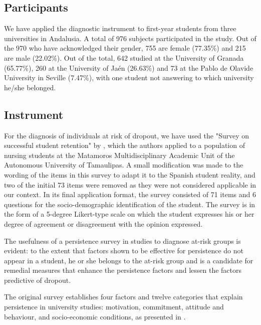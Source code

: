 \documentclass[english]{textolivre}
\begin{document}
\subsection{Participants}\label{sec-modelo}
We have applied the diagnostic instrument to first-year students from three universities in Andalusia. A total of 976 subjects participated in the study. Out of the 970 who have acknowledged their gender, 755 are female (77.35\%) and 215 are male (22.02\%). Out of the total, 642 studied at the University of Granada (65.77\%), 260 at the University of Jaén (26.63\%) and 73 at the Pablo de Olavide University in Seville (7.47\%), with one student not answering to which university he/she belonged.

\subsection{Instrument}\label{sec-organizacao}
For the diagnosis of individuals at risk of dropout, we have used the "Survey on successful student retention" by \textcite{velazquez_narvaez_factores_2017}, which the authors applied to a population of nursing students at the Matamoros Multidisciplinary Academic Unit of the Autonomous University of Tamaulipas. A small modification was made to the wording of the items in this survey to adapt it to the Spanish student reality, and two of the initial 73 items were removed as they were not considered applicable in our context. In its final application format, the survey consisted of 71 items and 6 questions for the socio-demographic identification of the student. The survey is in the form of a 5-degree Likert-type scale on which the student expresses his or her degree of agreement or disagreement with the opinion expressed.

The usefulness of a persistence survey in studies to diagnose at-risk groups is evident: to the extent that factors shown to be effective for persistence do not appear in a student, he or she belongs to the at-risk group and is a candidate for remedial measures that enhance the persistence factors and lessen the factors predictive of dropout.

The original survey establishes four factors and twelve categories that explain persistence in university studies: motivation, commitment, attitude and behaviour, and socio-economic conditions, as presented in .
\end{document}
